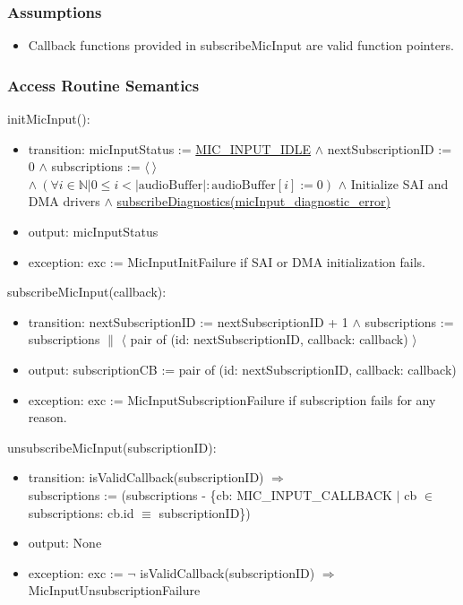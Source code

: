 \documentclass[12pt, titlepage]{article}
\begin{document}
\subsubsection{Assumptions}
\begin{itemize}
  \item Callback functions provided in subscribeMicInput are valid function
  pointers.
\end{itemize}

\subsubsection{Access Routine Semantics}
\noindent initMicInput():
\begin{itemize}
\item transition: micInputStatus :=
  \hyperref[enum:MicInputStatus:Idle]{MIC\_INPUT\_IDLE} \(\wedge\)
nextSubscriptionID := 0 \(\wedge\) subscriptions := \(\langle\ \rangle\)
\(\wedge\ (\forall i \in \mathbb{N} | 0 \le i < |\text{audioBuffer}|:
\text{audioBuffer}[i] := 0)\) \(\wedge\) Initialize SAI and DMA drivers
\(\wedge\)
\hyperref[mdiag:subscribe]{subscribeDiagnostics(micInput\_diagnostic\_error)}
\item output: micInputStatus
\item exception: exc := MicInputInitFailure if SAI or DMA initialization fails.
\end{itemize}
\noindent subscribeMicInput(callback):
\begin{itemize}
\item transition: nextSubscriptionID := nextSubscriptionID + 1 \(\wedge\)
subscriptions := subscriptions \(\parallel\) \(\langle\) pair of (id:
nextSubscriptionID, callback: callback) \(\rangle\)

\item output: subscriptionCB := pair of (id: nextSubscriptionID, callback:
callback) 
\item exception: exc := MicInputSubscriptionFailure if subscription fails for
any reason.
\end{itemize}

\noindent unsubscribeMicInput(subscriptionID):
\begin{itemize}
\item transition: isValidCallback(subscriptionID) \(\Rightarrow\) \\ 
subscriptions := (subscriptions - \{cb: MIC\_INPUT\_CALLBACK \(\vert\) cb
  \(\in\) subscriptions: cb.id \(\equiv\) subscriptionID\})
\item output: None
\item exception: exc := \(\neg\) isValidCallback(subscriptionID) \(\Rightarrow\)
MicInputUnsubscriptionFailure
\end{itemize}
\end{document}

